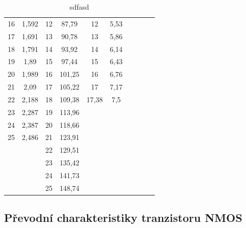 \documentclass[a4paper, czech]{article}
\begin{document}
\begin{table}[H]
\begin{tabular}{cccccccccc}
        16 & 1,592 & 12   & 87,79  & 12    & 5,53  &      &       &       &       \\
        17 & 1,691 & 13   & 90,78  & 13    & 5,86  &      &       &       &       \\
        18 & 1,791 & 14   & 93,92  & 14    & 6,14  &      &       &       &       \\
        19 & 1,89  & 15   & 97,44  & 15    & 6,43  &      &       &       &       \\
        20 & 1,989 & 16   & 101,25 & 16    & 6,76  &      &       &       &       \\
        21 & 2,09  & 17   & 105,22 & 17    & 7,17  &      &       &       &       \\
        22 & 2,188 & 18   & 109,38 & 17,38 & 7,5   &      &       &       &       \\
        23 & 2,287 & 19   & 113,96 &       &       &      &       &       &       \\
        24 & 2,387 & 20   & 118,66 &       &       &      &       &       &       \\
        25 & 2,486 & 21   & 123,91 &       &       &      &       &       &       \\
           &       & 22   & 129,51 &       &       &      &       &       &       \\
           &       & 23   & 135,42 &       &       &      &       &       &       \\
           &       & 24   & 141,73 &       &       &      &       &       &       \\
           &       & 25   & 148,74 &       &       &      &       &       &       \\
    \bottomrule
    \end{tabular}
    \caption{sdfasd}
\end{table}

\subsection{Převodní charakteristiky tranzistoru NMOS}
\end{document}

